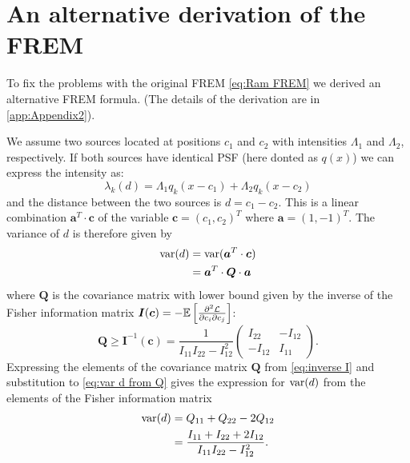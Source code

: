 
\section{An alternative derivation of the FREM\label{sub:An-alternative-derivation-FREM}} 

To fix the problems with the original FREM \autoref{eq:Ram FREM} we derived an alternative FREM formula. (The details of the derivation are in \autoref{app:Appendix2}). 

We assume two sources located at positions $c_1$ and $c_2$ with intensities $\Lambda_1$ and $\Lambda_2$, respectively. If both sources have identical PSF (here donted as $q(x)$) we can express the intensity as:
%
\begin{equation}
	\lambda_k(d)=\Lambda_1q_k(x-c_1)+\Lambda_2q_k(x-c_2)
	\label{eq:lambda}
\end{equation}
%
and the distance between the two sources is $d=c_1-c_2$. This is a linear combination $\bm{a}^{T}\cdot\bm{c}$ of the variable $\bm{c}=(c_1,c_2)^{T}$ where $\bm{a}=(1,-1)^{T}$. The variance of $d$ is therefore given by 
%
\begin{alignat}{2}
	\mathrm{var}(d)
	&=\mathrm{var}(\bm{a}^{T}\cdot\bm{c})\nonumber\\
	&=\bm{a}^{T}\cdot\bm{Q}\cdot\bm{a}
	\label{eq:var d from Q}
\end{alignat}
%
where $\bm{Q}$ is the covariance matrix with lower bound given by the inverse of the Fisher information matrix $\bm{I}(\bm{c})=-\mathbb{E}\left[\frac{\partial^2\mathcal{L}}{\partial c_i\partial c_j}\right]$: 
%
\begin{equation}
	\bm{Q}\geq\bm{I}^{-1}(\bm{c})=\frac{1}{I_{11}I_{22}-I_{12}^2}\left(
	\begin{array}{cc}
		I_{22} & -I_{12}\\
		-I_{12} & I_{11}
	\end{array}\right).
	\label{eq:inverse I}
\end{equation}
%
Expressing the elements of the covariance matrix $\bm{Q}$ from \autoref{eq:inverse I} and substitution to \autoref{eq:var d from Q} gives the expression for $\mathrm{var}(d)$ from the elements of the Fisher information matrix
%
\begin{alignat}{2}
	\mathrm{var}(d)
	&=Q_{11}+Q_{22}-2Q_{12}\nonumber\\
	&=\frac{I_{11}+I_{22}+2I_{12}}{I_{11}I_{22}-I_{12}^2}.
	\label{eq:variance d alternative}
\end{alignat}

